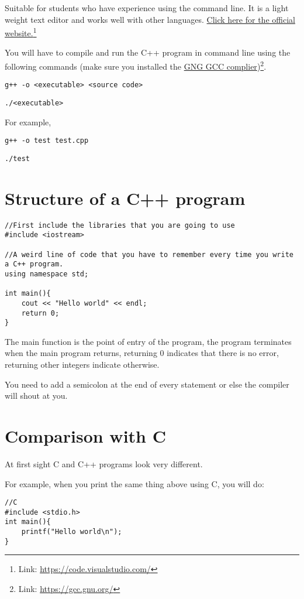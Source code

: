 Suitable for students who have experience using the command line. It is a light weight text editor and works well with other languages. \href{https://code.visualstudio.com/}{Click here for the official website.}\footnote{Link: \href{https://code.visualstudio.com/}{https://code.visualstudio.com/}}

You will have to compile and run the C++ program in command line using the following commands (make sure you installed the \href{https://gcc.gnu.org/}{GNG GCC complier})\footnote{Link: \href{https://gcc.gnu.org/}{https://gcc.gnu.org/}}.
\vspace{6mm}

\texttt{g++ -o <executable> <source code>}

\texttt{./<executable>}
\vspace{6mm}

For example,

\texttt{g++ -o test test.cpp}

\texttt{./test}


\section{Structure of a C++ program}
\begin{lstlisting}
//First include the libraries that you are going to use
#include <iostream> 

//A weird line of code that you have to remember every time you write a C++ program.
using namespace std;

int main(){
    cout << "Hello world" << endl;
    return 0;
}
\end{lstlisting}

The main function is the point of entry of the program, the program terminates when the main program returns, returning 0 indicates that there is no error, returning other integers indicate otherwise.

You need to add a semicolon at the end of every statement or else the compiler will shout at you. 

\section{Comparison with C}

At first sight C and C++ programs look very different.

For example, when you print the same thing above using C, you will do:

\begin{lstlisting}
//C
#include <stdio.h> 
int main(){
    printf("Hello world\n");
}
\end{lstlisting}

